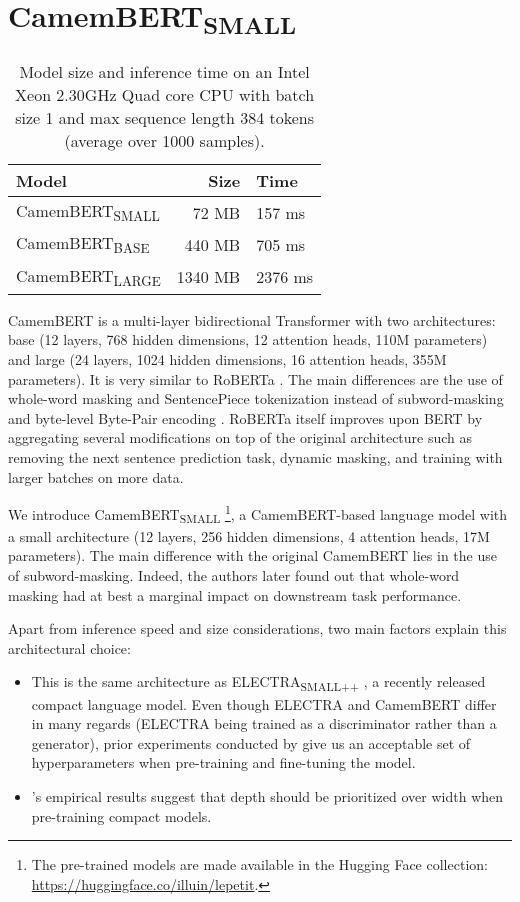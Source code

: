 \documentclass[11pt,a4paper]{article}
\begin{document}
\section{CamemBERT\textsubscript{SMALL}} \label{camembert-small}

\begin{table}
\centering
\begin{tabular}{lrl}
\hline \textbf{Model} & \textbf{Size} & \textbf{Time} \\ \hline
CamemBERT\textsubscript{SMALL} & 72 MB & 157 ms \\
CamemBERT\textsubscript{BASE} & 440 MB & 705 ms \\
CamemBERT\textsubscript{LARGE} & 1340 MB & 2376 ms \\
\hline
\end{tabular}
\caption{\label{inferencetime-table} Model size and inference time on an Intel Xeon 2.30GHz Quad core CPU with batch size 1 and max sequence length 384 tokens (average over 1000 samples).}
\end{table}

CamemBERT \citep{camembert} is a multi-layer bidirectional Transformer \citep{attention} with two architectures: base (12 layers, 768 hidden dimensions, 12 attention heads, 110M parameters) and large (24 layers, 1024 hidden dimensions, 16 attention heads, 355M parameters). It is very similar to RoBERTa \citep{roberta}. The main differences are the use of whole-word masking and SentencePiece tokenization \citep{sentencepiece} instead of subword-masking and byte-level Byte-Pair encoding \citep{bpe, gpt2}. RoBERTa itself improves upon BERT by aggregating several modifications on top of the original architecture such as removing the next sentence prediction task, dynamic masking, and training with larger batches on more data. 

We introduce CamemBERT\textsubscript{SMALL} \footnote{The pre-trained models are made available in the Hugging Face collection: \url{https://huggingface.co/illuin/lepetit}.}, a CamemBERT-based language model with a small architecture (12 layers, 256 hidden dimensions, 4 attention heads, 17M parameters). The main difference with the original CamemBERT lies in the use of subword-masking. Indeed, the authors later found out that whole-word masking had at best a marginal impact on downstream task performance.

Apart from inference speed and size considerations, two main factors explain this architectural choice:

\begin{itemize}
    \item This is the same architecture as ELECTRA\textsubscript{SMALL++} \citep{electra}, a recently released compact language model. Even though ELECTRA and CamemBERT differ in many regards (ELECTRA being trained as a discriminator rather than a generator), prior experiments conducted by \citet{electra} give us an acceptable set of hyperparameters when pre-training and fine-tuning the model.
    \item \citet{wellread}'s empirical results suggest that depth should be prioritized over width when pre-training compact models. 
\end{itemize} 
\end{document}
